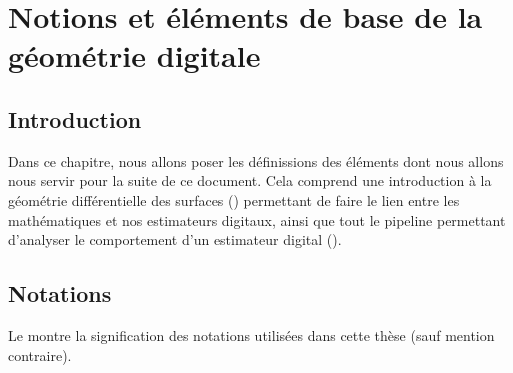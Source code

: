 %
\chapter{Notions et éléments de base de la géométrie digitale}
\label{sec:notions}


\setcounter{minitocdepth}{3}
\minitoc

\newpage
%
\section{Introduction}
%
Dans ce chapitre, nous allons poser les définissions des éléments dont nous allons nous servir pour la suite de ce document. Cela comprend une introduction à la géométrie différentielle des surfaces () permettant de faire le lien entre les mathématiques et nos estimateurs digitaux, ainsi que tout le pipeline permettant d'analyser le comportement d'un estimateur digital ().
%
\section{Notations}
%
Le  montre la signification des notations utilisées
dans cette thèse (sauf mention contraire).

